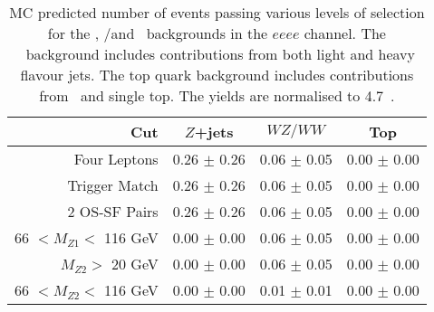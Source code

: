 \begin{table}[htbp]
  \centering
  \begin{tabular}{r|c|c|c} 
    \hline\hline
                 Cut &               $Z$+jets &             $WZ/WW$ &               Top\\ 
    \hline

        Four Leptons &  0.26 $\pm$ 0.26 & 0.06 $\pm$ 0.05 & 0.00 $\pm$ 0.00 \\ 
       Trigger Match &  0.26 $\pm$ 0.26 & 0.06 $\pm$ 0.05 & 0.00 $\pm$ 0.00 \\ 
       2 OS-SF Pairs &  0.26 $\pm$ 0.26 & 0.06 $\pm$ 0.05 & 0.00 $\pm$ 0.00 \\ 
66 $ < M_{Z1} < $ 116 GeV &  0.00 $\pm$ 0.00 & 0.06 $\pm$ 0.05 & 0.00 $\pm$ 0.00 \\ 
  $M_{Z2} > $ 20 GeV &  0.00 $\pm$ 0.00 & 0.06 $\pm$ 0.05 & 0.00 $\pm$ 0.00 \\ 
66 $ < M_{Z2} < $ 116 GeV &  0.00 $\pm$ 0.00 & 0.01 $\pm$ 0.01 & 0.00 $\pm$ 0.00 \\ 
    \hline\hline
  \end{tabular}
  \caption[MC predicted number of events passing various levels of selection for
  the \Zjets, \WZ/\WW and \topquark\ backgrounds in the $eeee$ channel.]
  {MC predicted number of events passing various levels of selection for
  the \Zjets, \WZ/\WW and \topquark\ backgrounds in the $eeee$ channel. The
  \Zjets\ background includes contributions from both light and heavy flavour
  jets. The top quark background includes contributions from \ttbar\ and
  single top. The yields are normalised to 4.7~\ifb.
  }
  \label{table:mc-bg-4mu}
\end{table}

